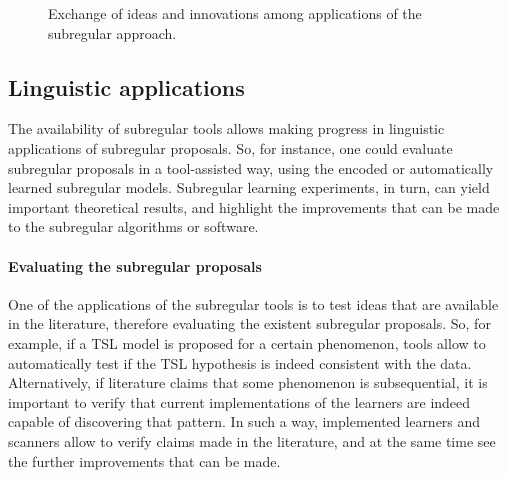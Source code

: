 \begin{figure}[h!]
\centering
{}
\caption{Exchange of ideas and innovations among applications of the subregular approach.}
\label{finaltriangle}
\end{figure}



\subsection{Linguistic applications}


The availability of subregular tools allows making progress in linguistic applications of subregular proposals.
So, for instance, one could evaluate subregular proposals in a tool-assisted way, using the encoded or automatically learned subregular models.
Subregular learning experiments, in turn, can yield important theoretical results, and highlight the improvements that can be made to the subregular algorithms or software.




\paragraph{Evaluating the subregular proposals}
One of the applications of the subregular tools is to test ideas that are available in the literature, therefore evaluating the existent subregular proposals.
So, for example, if a TSL model is proposed for a certain phenomenon, tools allow to automatically test if the TSL hypothesis is indeed consistent with the data.
Alternatively, if literature claims that some phenomenon is subsequential, it is important to verify that current implementations of the learners are indeed capable of discovering that pattern.
In such a way, implemented learners and scanners allow to verify claims made in the literature, and at the same time see the further improvements that can be made.


